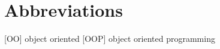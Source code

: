 \section*{Abbreviations}
\thispagestyle{plain}
\begin{acronym}[PECVD]
	[OO] object oriented
	[OOP] object oriented programming
	
\end{acronym}